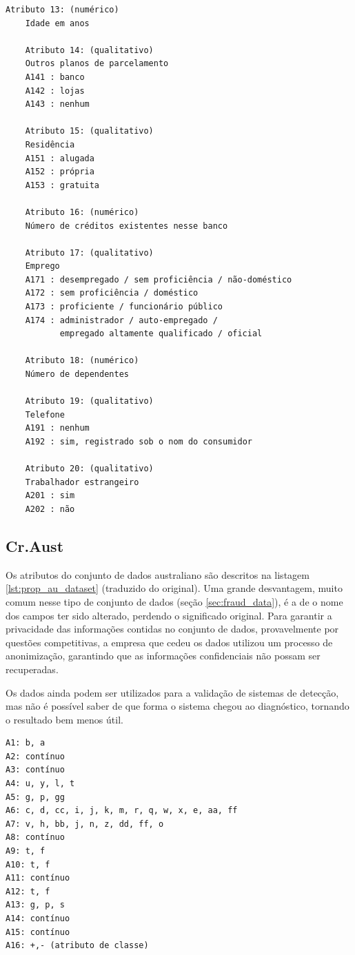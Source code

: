 \begin{lstlisting}[caption=Atributos do conjunto de dados alemão,label=lst:ge_dataset]
    Atributo 13: (numérico)
    Idade em anos

    Atributo 14: (qualitativo)
    Outros planos de parcelamento
    A141 : banco
    A142 : lojas
    A143 : nenhum

    Atributo 15: (qualitativo)
    Residência
    A151 : alugada
    A152 : própria
    A153 : gratuita

    Atributo 16: (numérico)
    Número de créditos existentes nesse banco

    Atributo 17: (qualitativo)
    Emprego
    A171 : desempregado / sem proficiência / não-doméstico
    A172 : sem proficiência / doméstico
    A173 : proficiente / funcionário público
    A174 : administrador / auto-empregado /
           empregado altamente qualificado / oficial

    Atributo 18: (numérico)
    Número de dependentes

    Atributo 19: (qualitativo)
    Telefone
    A191 : nenhum
    A192 : sim, registrado sob o nom do consumidor

    Atributo 20: (qualitativo)
    Trabalhador estrangeiro
    A201 : sim
    A202 : não
\end{lstlisting}

\subsection{Cr.Aust}

Os atributos do conjunto de dados australiano são descritos na listagem \ref{lst:prop_au_dataset} (traduzido do original). Uma grande desvantagem, muito comum nesse tipo de conjunto de dados (seção \ref{sec:fraud_data}), é a de o nome dos campos ter sido alterado, perdendo o significado original. Para garantir a privacidade das informações contidas no conjunto de dados, provavelmente por questões competitivas, a empresa que cedeu os dados utilizou um processo de anonimização, garantindo que as informações confidenciais não possam ser recuperadas.

Os dados ainda podem ser utilizados para a validação de sistemas de detecção, mas não é possível saber de que forma o sistema chegou ao diagnóstico, tornando o resultado bem menos útil.

\vspace{1cm}
\begin{lstlisting}[caption=Atributos do conjunto de dados Cr.Aust, label=lst:prop_au_dataset]
A1: b, a
A2: contínuo
A3: contínuo
A4: u, y, l, t
A5: g, p, gg
A6: c, d, cc, i, j, k, m, r, q, w, x, e, aa, ff
A7: v, h, bb, j, n, z, dd, ff, o
A8: contínuo
A9: t, f
A10: t, f
A11: contínuo
A12: t, f
A13: g, p, s
A14: contínuo
A15: contínuo
A16: +,- (atributo de classe)
\end{lstlisting}

